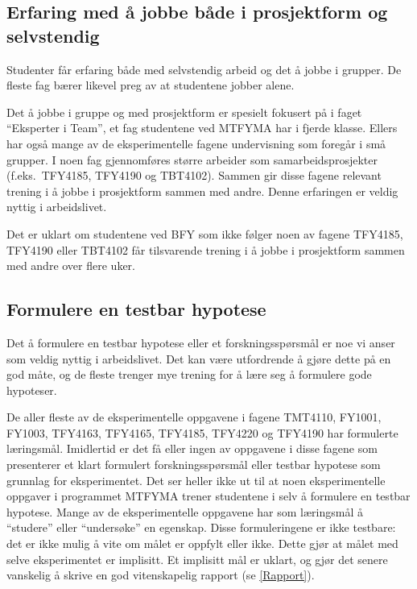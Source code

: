 \documentclass{article}
\begin{document}
\subsection{Erfaring med å jobbe både i prosjektform og selvstendig}
Studenter får erfaring både med selvstendig arbeid og det å jobbe i grupper. De fleste fag bærer likevel preg av at studentene jobber alene.

Det å jobbe i gruppe og med prosjektform er spesielt fokusert på i faget ``Eksperter i Team'', et fag studentene ved MTFYMA har i fjerde klasse. Ellers har også mange av de eksperimentelle fagene undervisning som foregår i små grupper. I noen fag gjennomføres større arbeider som samarbeidsprosjekter (f.eks.~TFY4185, TFY4190 og TBT4102). Sammen gir disse fagene relevant trening i å jobbe i prosjektform sammen med andre. Denne erfaringen er veldig nyttig i arbeidslivet.

Det er uklart om studentene ved BFY som ikke følger noen av fagene TFY4185, TFY4190 eller TBT4102 får tilsvarende trening i å jobbe i prosjektform sammen med andre over flere uker.

\subsection{Formulere en testbar hypotese}
Det å formulere en testbar hypotese eller et forskningsspørsmål er noe vi anser som veldig nyttig i arbeidslivet. Det kan være utfordrende å gjøre dette på en god måte, og de fleste trenger mye trening for å lære seg å formulere gode hypoteser.

De aller fleste av de eksperimentelle oppgavene i fagene TMT4110, FY1001, FY1003, TFY4163, TFY4165, TFY4185, TFY4220 og TFY4190 har formulerte læringsmål. Imidlertid er det få eller ingen av oppgavene i disse fagene som presenterer et klart formulert forskningsspørsmål eller testbar hypotese som grunnlag for eksperimentet. Det ser heller ikke ut til at noen eksperimentelle oppgaver i programmet MTFYMA trener studentene i selv å formulere en testbar hypotese. Mange av de eksperimentelle oppgavene har som læringsmål å ``studere'' eller ``undersøke'' en egenskap. Disse formuleringene er ikke testbare: det er ikke mulig å vite om målet er oppfylt eller ikke. Dette gjør at målet med selve eksperimentet er implisitt. Et implisitt mål er uklart, og gjør det senere vanskelig å skrive en god vitenskapelig rapport (se \cref{Rapport}).
\end{document}
